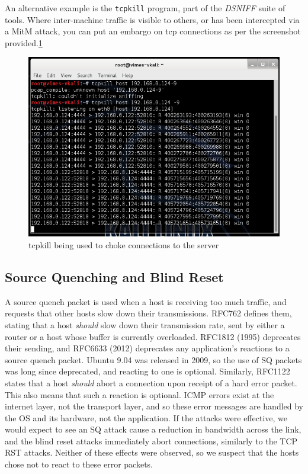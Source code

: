 An alternative example is the {\tt tcpkill} program, part of the \emph{DSNIFF} suite of tools. Where inter-machine
traffic is visible to others, or has been intercepted via a MitM attack, you can put an embargo on tcp connections as
per the screenshot provided.\ref{fig:tcpkill}

\begin{figure}[h] \centering \includegraphics[width=.5\linewidth]{images/tcpkill.png} \caption{tcpkill being used to
choke connections to the server} \label{fig:tcpkill} \end{figure}

\subsection{Source Quenching and Blind Reset}

A source quench packet is used when a host is receiving too much traffic, and requests that other hosts slow down their
transmissions. RFC762 defines them, stating that a host \emph{should} slow down their transmission rate, sent by either
a router or a host whose buffer is currently overloaded. RFC1812 (1995) deprecates their sending, and RFC6633 (2012)
deprecates any application's reactions to a source quench packet. Ubuntu 9.04 was released in 2009, so the use of SQ
packets was long since deprecated, and reacting to one is optional. Similarly, RFC1122 states that a host \emph{should}
abort a connection upon receipt of a hard error packet. This also means that such a reaction is optional. ICMP errors
exist at the internet layer, not the transport layer, and so these error messages are handled by the OS and its
hardware, not the application. If the attacks were effective, we would expect to see an SQ attack cause a reduction in
bandwidth across the link, and the blind reset attacks immediately abort connections, similarly to the TCP RST attacks.
Neither of these effects were observed, so we suspect that the hosts chose not to react to these error packets.


